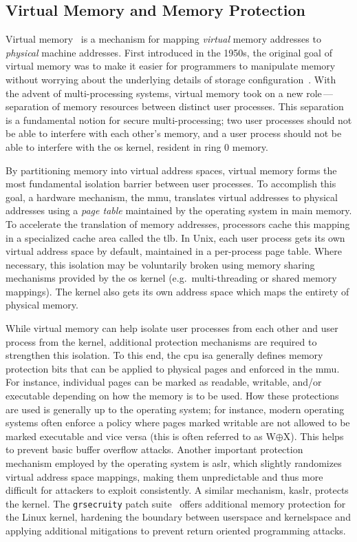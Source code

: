 \documentclass[
  fontsize=12pt,
  titlepage=firstiscover,
  paper=letter,
oneside,
  cleardoublepage=plain,
  parskip=half-,
  DIV=10,
  parindent,
  appendixprefix,
  chapterprefix,
  listof=totoc,
]{scrbook}
\begin{document}
\subsection{Virtual Memory and Memory Protection}\label{ss:virtual-memory}

Virtual memory~\cite{denning1970_virtual} is a mechanism for mapping \textit{virtual}
memory addresses to \textit{physical} machine addresses. First introduced in the 1950s,
the original goal of virtual memory was to make it easier for programmers to manipulate
memory without worrying about the underlying details of storage
configuration~\cite{denning1970_virtual}. With the advent of multi-processing systems,
virtual memory took on a new role\,---\,separation of memory resources between distinct
user processes. This separation is a fundamental notion for secure multi-processing; two
user processes should not be able to interfere with each other's memory, and a user
process should not be able to interfere with the \gls{os} kernel, resident in ring
0 memory.

By partitioning memory into virtual address spaces, virtual memory forms the most
fundamental isolation barrier between user processes. To accomplish this goal, a hardware
mechanism, the \gls{mmu}, translates virtual addresses to physical addresses using
a \textit{page table} maintained by the operating system in main memory. To accelerate the
translation of memory addresses, processors cache this mapping in a specialized
cache area called the \gls{tlb}.  In Unix, each user process gets its own virtual address
space by default, maintained in a per-process page table. Where necessary, this isolation
may be voluntarily broken using memory sharing mechanisms provided by the \gls{os} kernel
(e.g.\ multi-threading or shared memory mappings). The kernel also gets its own address
space which maps the entirety of physical memory.

While virtual memory can help isolate user processes from each other and user process from
the kernel, additional protection mechanisms are required to strengthen this isolation. To
this end, the \gls{cpu} \gls{isa} generally defines memory protection bits that can be applied
to physical pages and enforced in the \gls{mmu}. For instance, individual pages can be
marked as readable, writable, and/or executable depending on how the memory is to be used.
How these protections are used is generally up to the operating system; for instance,
modern operating systems often enforce a policy where pages marked writable are not
allowed to be marked executable and vice versa (this is often referred to as W$\oplus$X).
This helps to prevent basic buffer overflow attacks. Another important
protection mechanism employed by the operating system is \gls{aslr}, which slightly
randomizes virtual address space mappings, making them unpredictable and thus more difficult for
attackers to exploit consistently. A similar mechanism, \gls{kaslr}, protects the kernel.
The \texttt{grsecruity} patch suite~\cite{grsecruity} offers additional memory protection for the
Linux kernel, hardening the boundary between userspace and kernelspace and applying
additional mitigations to prevent return oriented programming attacks.
\end{document}
